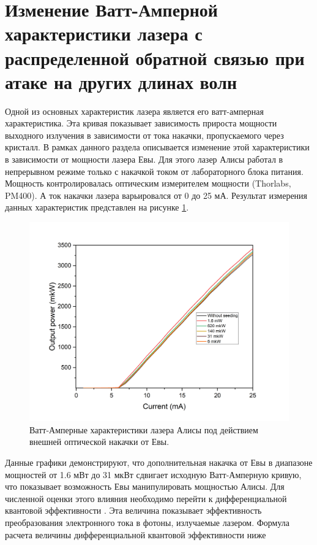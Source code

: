 \section{Изменение Ватт-Амперной характеристики лазера с распределенной обратной связью при атаке на других длинах волн}\label{sec:ch4/sect3}
Одной из основных характеристик лазера является его ватт-амперная характеристика. Эта кривая показывает зависимость прироста мощности выходного излучения в зависимости от тока накачки, пропускаемого через кристалл. В рамках данного раздела описывается изменение этой характеристики в зависимости от мощности лазера Евы.
Для этого лазер Алисы работал в непрерывном режиме только с накачкой током от лабораторного блока питания. Мощность контролировалась оптическим измерителем мощности (Thorlabs, PM400). А ток накачки лазера варьировался от 0 до 25 мА. 
Результат измерения данных характеристик представлен на рисунке \ref{fig:Watt-Amp ch4}.
\begin{figure}
    \centering
    \includegraphics[width=\linewidth]{images/ватт ампер для диссера.png}
    \caption{Ватт-Амперные характеристики лазера Алисы под действием внешней оптической накачки от Евы.}
    \label{fig:Watt-Amp ch4}
\end{figure}
Данные графики демонстрируют, что дополнительная накачка от Евы в диапазоне мощностей от 1.6 мВт до 31 мкВт сдвигает исходную Ватт-Амперную кривую, что показывает возможность Евы манипулировать мощностью Алисы. Для численной оценки этого влияния необходимо перейти к дифференциальной квантовой эффективности \cite{cassidy1984,tomiyasu2017}. Эта величина показывает эффективность преобразования электронного тока в фотоны, излучаемые лазером. Формула расчета величины дифференциальной квантовой эффективности ниже 

